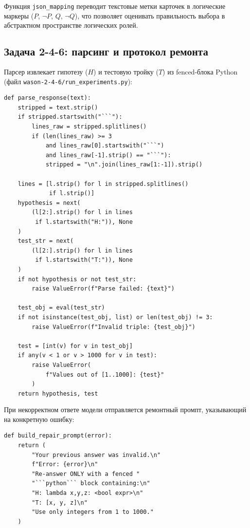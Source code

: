 Функция \texttt{json\_mapping} переводит текстовые метки карточек в логические маркеры ($P$, $\lnot P$, $Q$, $\lnot Q$), что позволяет оценивать правильность выбора в абстрактном пространстве логических ролей.

\subsection{Задача 2-4-6: парсинг и протокол ремонта}

Парсер извлекает гипотезу ($H$) и тестовую тройку ($T$) из fenced-блока Python (файл \texttt{wason-2-4-6/run\_experiments.py}):

\begin{lstlisting}
def parse_response(text):
    stripped = text.strip()
    if stripped.startswith("```"):
        lines_raw = stripped.splitlines()
        if (len(lines_raw) >= 3
            and lines_raw[0].startswith("```")
            and lines_raw[-1].strip() == "```"):
            stripped = "\n".join(lines_raw[1:-1]).strip()

    lines = [l.strip() for l in stripped.splitlines()
             if l.strip()]
    hypothesis = next(
        (l[2:].strip() for l in lines
         if l.startswith("H:")), None
    )
    test_str = next(
        (l[2:].strip() for l in lines
         if l.startswith("T:")), None
    )
    if not hypothesis or not test_str:
        raise ValueError(f"Parse failed: {text}")

    test_obj = eval(test_str)
    if not isinstance(test_obj, list) or len(test_obj) != 3:
        raise ValueError(f"Invalid triple: {test_obj}")

    test = [int(v) for v in test_obj]
    if any(v < 1 or v > 1000 for v in test):
        raise ValueError(
            f"Values out of [1..1000]: {test}"
        )
    return hypothesis, test
\end{lstlisting}

При некорректном ответе модели отправляется ремонтный промпт, указывающий на конкретную ошибку:

\begin{lstlisting}
def build_repair_prompt(error):
    return (
        "Your previous answer was invalid.\n"
        f"Error: {error}\n"
        "Re-answer ONLY with a fenced "
        "```python``` block containing:\n"
        "H: lambda x,y,z: <bool expr>\n"
        "T: [x, y, z]\n"
        "Use only integers from 1 to 1000."
    )
\end{lstlisting}

